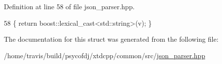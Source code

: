 Definition at line 58 of file json\-\_\-parser.\-hpp.


\begin{DoxyCode}
58 \{ \textcolor{keywordflow}{return} boost::lexical\_cast<std::string>(v); \}
\end{DoxyCode}


The documentation for this struct was generated from the following file\-:\begin{DoxyCompactItemize}
\item 
/home/travis/build/psycofdj/xtdcpp/common/src/\hyperlink{json__parser_8hpp}{json\-\_\-parser.\-hpp}\end{DoxyCompactItemize}
